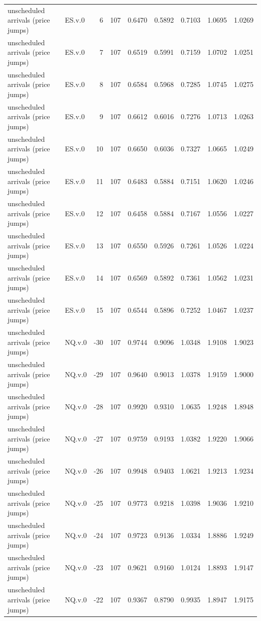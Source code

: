 \begin{tabular}{llrrrrrrr}
unscheduled arrivals (price jumps) & ES.v.0 & 6 & 107 & 0.6470 & 0.5892 & 0.7103 & 1.0695 & 1.0269 \\
unscheduled arrivals (price jumps) & ES.v.0 & 7 & 107 & 0.6519 & 0.5991 & 0.7159 & 1.0702 & 1.0251 \\
unscheduled arrivals (price jumps) & ES.v.0 & 8 & 107 & 0.6584 & 0.5968 & 0.7285 & 1.0745 & 1.0275 \\
unscheduled arrivals (price jumps) & ES.v.0 & 9 & 107 & 0.6612 & 0.6016 & 0.7276 & 1.0713 & 1.0263 \\
unscheduled arrivals (price jumps) & ES.v.0 & 10 & 107 & 0.6650 & 0.6036 & 0.7327 & 1.0665 & 1.0249 \\
unscheduled arrivals (price jumps) & ES.v.0 & 11 & 107 & 0.6483 & 0.5884 & 0.7151 & 1.0620 & 1.0246 \\
unscheduled arrivals (price jumps) & ES.v.0 & 12 & 107 & 0.6458 & 0.5884 & 0.7167 & 1.0556 & 1.0227 \\
unscheduled arrivals (price jumps) & ES.v.0 & 13 & 107 & 0.6550 & 0.5926 & 0.7261 & 1.0526 & 1.0224 \\
unscheduled arrivals (price jumps) & ES.v.0 & 14 & 107 & 0.6569 & 0.5892 & 0.7361 & 1.0562 & 1.0231 \\
unscheduled arrivals (price jumps) & ES.v.0 & 15 & 107 & 0.6544 & 0.5896 & 0.7252 & 1.0467 & 1.0237 \\
unscheduled arrivals (price jumps) & NQ.v.0 & -30 & 107 & 0.9744 & 0.9096 & 1.0348 & 1.9108 & 1.9023 \\
unscheduled arrivals (price jumps) & NQ.v.0 & -29 & 107 & 0.9640 & 0.9013 & 1.0378 & 1.9159 & 1.9000 \\
unscheduled arrivals (price jumps) & NQ.v.0 & -28 & 107 & 0.9920 & 0.9310 & 1.0635 & 1.9248 & 1.8948 \\
unscheduled arrivals (price jumps) & NQ.v.0 & -27 & 107 & 0.9759 & 0.9193 & 1.0382 & 1.9220 & 1.9066 \\
unscheduled arrivals (price jumps) & NQ.v.0 & -26 & 107 & 0.9948 & 0.9403 & 1.0621 & 1.9213 & 1.9234 \\
unscheduled arrivals (price jumps) & NQ.v.0 & -25 & 107 & 0.9773 & 0.9218 & 1.0398 & 1.9036 & 1.9210 \\
unscheduled arrivals (price jumps) & NQ.v.0 & -24 & 107 & 0.9723 & 0.9136 & 1.0334 & 1.8886 & 1.9249 \\
unscheduled arrivals (price jumps) & NQ.v.0 & -23 & 107 & 0.9621 & 0.9160 & 1.0124 & 1.8893 & 1.9147 \\
unscheduled arrivals (price jumps) & NQ.v.0 & -22 & 107 & 0.9367 & 0.8790 & 0.9935 & 1.8947 & 1.9175 \\

\end{tabular}
